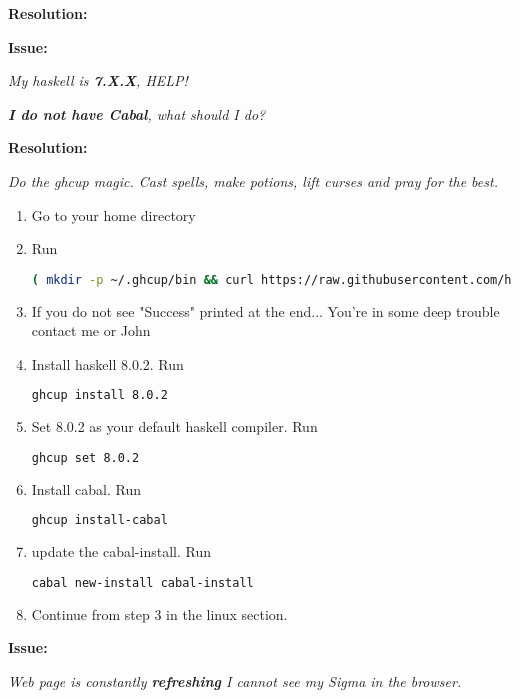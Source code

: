 \documentclass[11pt,a4paper]{article}
\begin{document}
\textbf{Resolution:}
 

 \textbf{Issue:}
 
\textit{ My haskell is \textbf{7.X.X}, HELP!}
 
\textit{ \textbf{I do not have Cabal}, what should I do?}

\textbf{Resolution:}
 
        \textit{Do the ghcup magic. Cast spells, make potions, lift curses and pray for the best.}
        
        \begin{enumerate}
             
        \item Go to your home directory
        \item Run
\begin{lstlisting}[language=Bash,breaklines]
( mkdir -p ~/.ghcup/bin && curl https://raw.githubusercontent.com/haskell/ghcup/master/ghcup > ~/.ghcup/bin/ghcup && chmod +x ~/.ghcup/bin/ghcup) && echo "Success"
\end{lstlisting}
        \item If you do not see "Success" printed at the end... You're in some deep trouble contact me or John
        \item Install haskell 8.0.2. Run 
\begin{lstlisting}[language=Bash]
ghcup install 8.0.2
\end{lstlisting}
        \item Set 8.0.2 as your default haskell compiler. Run
\begin{lstlisting}[language=Bash]
ghcup set 8.0.2
\end{lstlisting}
        
        \item Install cabal. Run
\begin{lstlisting}[language=Bash]
ghcup install-cabal
\end{lstlisting}

        \item update the cabal-install. Run
\begin{lstlisting}[language=Bash]
cabal new-install cabal-install
\end{lstlisting}

        \item Continue from step 3 in the linux section.
        \end{enumerate}

 \textbf{Issue:}
 
 \textit{Web page is constantly \textbf{refreshing} I cannot see my Sigma in the browser.}
 
\end{document}
